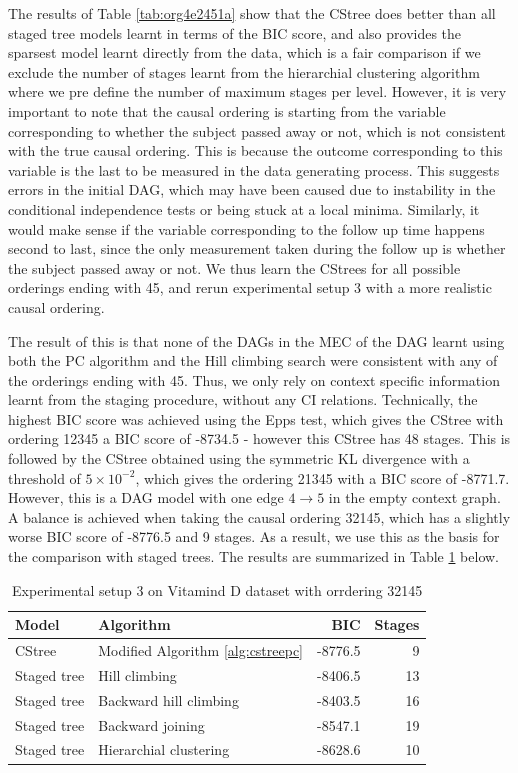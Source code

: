 \documentclass{tufte-book}
\begin{document}
The results of Table \ref{tab:org4e2451a} show that the CStree does better than all staged tree models learnt in terms of the BIC score, and also provides the sparsest model learnt directly from the data, which is a fair comparison if we exclude the number of stages learnt from the hierarchial clustering algorithm where we pre define the number of maximum stages per level. However, it is very important to note that the causal ordering is starting from the variable corresponding to whether the subject passed away or not, which is not consistent with the true causal ordering. This is because the outcome corresponding to this variable is the last to be measured in the data generating process. This suggests errors in the initial DAG, which may have been caused due to instability in the conditional independence tests or being stuck at a local minima. Similarly, it would make sense if the variable corresponding to the follow up time happens second to last, since the only measurement taken during the follow up is whether the subject passed away or not. We thus learn the CStrees for all possible orderings ending with 45, and rerun experimental setup 3 with a more realistic causal ordering.

The result of this is that none of the DAGs in the MEC of the DAG learnt using both the PC algorithm and the Hill climbing search were consistent with any of the orderings ending with 45. Thus, we only rely on context specific information learnt from the staging procedure, without any CI relations. Technically, the highest BIC score was achieved using the Epps test, which gives the CStree with ordering 12345 a BIC score of -8734.5 - however this CStree has 48 stages. This is followed by the CStree obtained using the symmetric KL divergence with a threshold of \(5 \times 10^{-2}\), which gives the ordering 21345 with a BIC score of -8771.7. However, this is a DAG model with one edge \(4 \rightarrow 5\) in the empty context graph. A balance is achieved when taking the causal ordering 32145, which has a slightly worse BIC score of -8776.5 and 9 stages. As a result, we use this as the basis for the comparison with staged trees. The results are summarized in Table \ref{tab:orgb96d9a5} below.


\begin{table}[htbp]
\caption{\label{tab:orgb96d9a5}Experimental setup 3 on Vitamind D dataset with orrdering 32145}
\centering
\begin{tabular}{l|l|r|r}
\hline
Model & Algorithm & BIC & Stages\\
\hline
CStree & Modified Algorithm \ref{alg:cstreepc} & -8776.5 & 9\\
Staged tree & Hill climbing & -8406.5 & 13\\
Staged tree & Backward hill climbing & -8403.5 & 16\\
Staged tree & Backward joining & -8547.1 & 19\\
Staged tree & Hierarchial clustering & -8628.6 & 10\\
\end{tabular}
\end{table}
\end{document}
